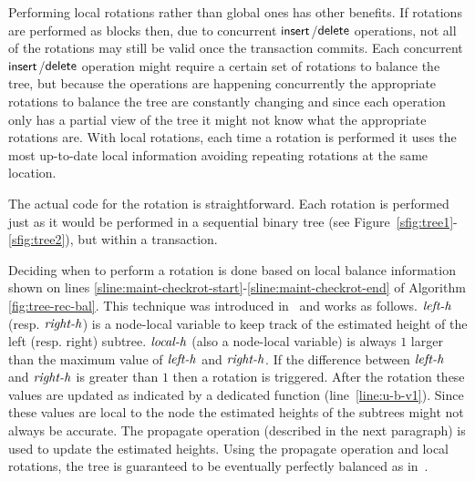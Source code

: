 Performing local rotations rather than global ones has other benefits.
If rotations are performed as blocks then, due to concurrent  $\act{insert}$/$\act{delete}$ operations, not all of the rotations may still be valid once the transaction commits.
Each concurrent $\act{insert}$/$\act{delete}$ operation might require a certain set of rotations to balance the tree,
but because the operations are happening concurrently the appropriate rotations to balance the tree are constantly changing
and since each operation only has a partial view of the tree it might not know what the appropriate rotations are.
With local rotations, each time a rotation is performed it uses the most up-to-date local information avoiding repeating rotations at the same location.

The actual code for the rotation is straightforward.
Each rotation is performed just as it would be performed in a sequential binary tree (see Figure~\ref{sfig:tree1}-\ref{sfig:tree2}), but within a transaction.

Deciding when to perform a rotation is done based on local balance information 
shown on lines \ref{sline:maint-checkrot-start}-\ref{sline:maint-checkrot-end} of Algorithm \ref{fig:tree-rec-bal}.
This technique was introduced in~\cite{IRISAppr} and works as follows.
$\ms{left-h}$ (resp. $\ms{right-h}$) is a node-local variable to keep track of the estimated height of the left (resp. right) subtree.
$\ms{local-h}$ (also a node-local variable) is always $1$ larger than the maximum value of $\ms{left-h}$ and $\ms{right-h}$.
If the difference between $\ms{left-h}$ and $\ms{right-h}$ is greater than $1$ then a rotation is triggered.
After the rotation these values are updated as indicated by a dedicated function (line~\ref{line:u-b-v1}).
Since these values are local to the node the estimated heights of the subtrees might not always be accurate.
The propagate operation (described in the next paragraph) is used to update the estimated heights.
Using the propagate operation and local rotations, the tree is guaranteed to be eventually perfectly balanced
as in~\cite{IRISAppr,BCCO10}.

